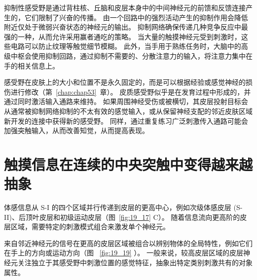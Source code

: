 抑制性感受野是通过背柱核、丘脑和皮层本身中的中间神经元的前馈和反馈连接产生的，它们限制了兴奋的传播。 
由一个回路中的强烈活动产生的抑制作用会降低附近仅处于微弱兴奋状态的神经元的输出。
抑制网络确保传递几种竞争反应中最强的一种，从而允许采用赢者通吃的策略。
当大量的触摸神经元受到刺激时，这些电路可以防止纹理等触觉细节模糊。
此外，当手用于熟练任务时，大脑中的高级中枢会使用抑制回路，通过抑制不需要的、分散注意力的输入，将注意力集中在手的相关信息上。


感受野在皮肤上的大小和位置不是永久固定的，而是可以根据经验或感觉神经的损伤进行修改（第~\ref{chap:chap53}~章）。
皮质感受野似乎是在发育过程中形成的，并通过同时激活输入通路来维持。
如果周围神经受伤或被横切，其皮层投射目标会从通常被抑制网络抑制的不太有效的感觉输入，或从保留神经支配的邻近皮肤区域新开发的连接中获得新的感受野。
同样，通过重复练习广泛刺激传入通路可能会加强突触输入，从而改善知觉，从而提高表现。



\section{触摸信息在连续的中央突触中变得越来越抽象}

体感信息从 S-I 的四个区域并行传递到皮层的更高中心，例如次级体感皮层 (S-II)、后顶叶皮层和初级运动皮层（图~\ref{fig:19_17} C）。
随着信息流向更高阶的皮层区域，需要特定的刺激模式组合来激发单个神经元。


来自邻近神经元的信号在更高的皮层区域被组合以辨别物体的全局特性，例如它们在手上的方向或运动方向（图 ~\ref{fig:19_19} ）。
一般来说，较高皮层区域的皮层神经元关注独立于其感受野中刺激位置的感觉特征，抽象出特定类别刺激共有的对象属性。


